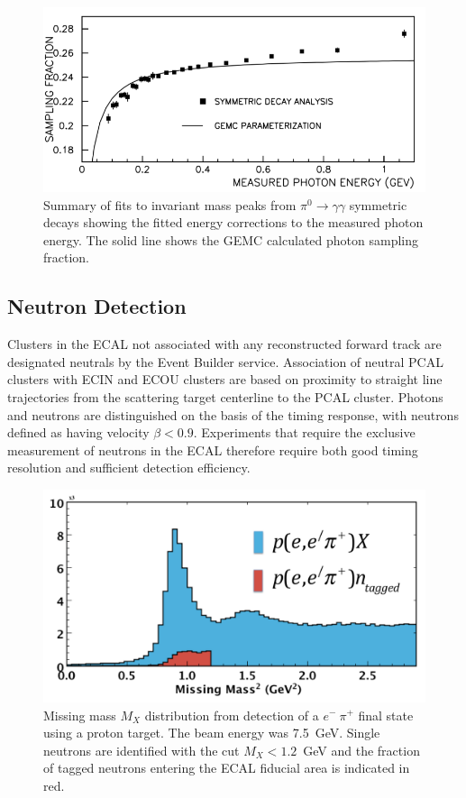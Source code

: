 \begin{figure}[h]
\centering
\includegraphics[width=1.0\columnwidth,keepaspectratio]{img/fx-study-summary-2.png}
\caption[]{Summary of fits to invariant mass peaks from $\pi^0 \rightarrow \gamma \gamma$ symmetric decays
  showing the fitted energy corrections to the measured photon energy. The solid line shows the GEMC calculated
  photon sampling fraction.}
\label{fig:fx-study-summary-2}
\end{figure}

\subsection{Neutron Detection}

Clusters in the ECAL not associated with any reconstructed forward track are designated neutrals by the Event
Builder service. Association of neutral PCAL clusters with ECIN and ECOU clusters are based on proximity to
straight line trajectories from the scattering target centerline to the PCAL cluster. Photons and neutrons are
distinguished on the basis of the timing response, with neutrons defined as having velocity $\beta < 0.9$.
Experiments that require the exclusive measurement of neutrons in the ECAL therefore require both good timing
resolution and sufficient detection efficiency. 

\begin{figure}[h]
\centering
\includegraphics[width=1.0\columnwidth,keepaspectratio]{img/S10_4_0.png}
\caption[]{Missing mass $M_X$ distribution from detection of a $e^-~\pi^+$ final state using a proton target. The
  beam energy was 7.5~GeV. Single neutrons are identified with the cut $M_X < 1.2$~GeV and the fraction of tagged
  neutrons entering the ECAL fiducial area is indicated in red.}
\label{fig:S10_4_0}
\end{figure}


